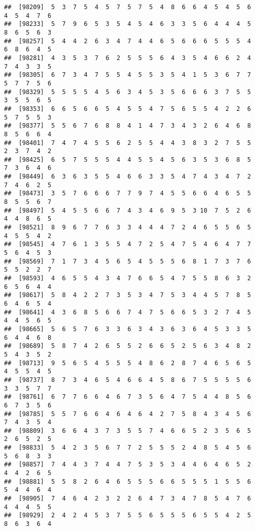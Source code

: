 \documentclass[
]{book}
\begin{document}
\begin{verbatim}
##  [98209]  5  3  7  5  4  5  7  5  7  5  4  8  6  6  4  5  4  5  6  4  5  4  7  6
##  [98233]  5  7  9  6  5  3  5  4  5  4  6  3  3  5  6  4  4  4  5  8  6  5  6  3
##  [98257]  5  4  4  2  6  3  4  7  4  4  6  5  6  6  6  5  5  5  4  6  8  6  4  5
##  [98281]  4  3  5  3  7  6  2  5  5  5  6  4  3  5  4  6  6  2  4  7  4  3  3  5
##  [98305]  6  7  3  4  7  5  5  4  5  5  3  5  4  1  5  3  6  7  7  5  7  7  5  6
##  [98329]  5  5  5  5  4  5  6  3  4  5  3  5  6  6  6  3  7  5  5  3  5  5  6  5
##  [98353]  6  6  5  6  6  5  4  5  5  4  7  5  6  5  5  4  2  2  6  5  7  5  5  3
##  [98377]  5  5  6  7  6  8  8  4  1  4  7  3  4  3  2  6  4  6  8  8  5  6  6  4
##  [98401]  7  4  7  4  5  5  6  2  5  5  4  4  3  8  3  2  7  5  5  2  3  7  4  2
##  [98425]  6  5  7  5  5  5  4  4  5  5  4  5  6  3  5  3  6  8  5  7  3  6  4  6
##  [98449]  6  3  6  3  5  5  4  6  6  3  3  5  4  7  4  3  4  7  2  7  4  6  2  5
##  [98473]  3  5  7  6  6  6  7  7  9  7  4  5  5  6  6  4  6  5  5  8  5  5  6  7
##  [98497]  5  4  5  5  6  6  7  4  3  4  6  9  5  3 10  7  5  2  6  4  4  8  6  5
##  [98521]  8  9  6  7  7  6  3  3  4  4  4  7  2  4  6  5  5  6  5  4  5  5  4  2
##  [98545]  4  7  6  1  3  5  5  4  7  2  5  4  7  5  4  6  4  7  7  5  6  4  5  3
##  [98569]  7  1  7  3  4  5  6  5  4  5  5  5  6  8  1  7  3  7  6  5  5  2  2  7
##  [98593]  4  6  5  5  4  3  4  7  6  6  5  4  7  5  5  8  6  3  2  6  5  6  4  4
##  [98617]  5  8  4  2  2  7  3  5  3  4  7  5  3  4  4  5  7  8  5  6  4  6  5  4
##  [98641]  4  3  6  8  5  6  6  7  4  7  5  6  6  5  3  2  7  4  5  4  4  5  6  5
##  [98665]  5  6  5  7  6  3  3  6  3  4  3  6  3  6  4  5  3  3  5  6  4  4  6  8
##  [98689]  5  8  7  4  2  6  5  5  2  6  6  5  2  5  6  3  4  8  2  5  4  3  5  2
##  [98713]  9  5  6  5  4  5  5  5  4  8  6  2  8  7  4  6  5  6  5  4  5  5  4  5
##  [98737]  8  7  3  4  6  5  4  6  6  4  5  8  6  7  5  5  5  5  6  3  3  5  7  7
##  [98761]  6  7  7  6  6  4  6  7  3  5  6  4  7  5  4  4  8  5  6  6  7  3  5  6
##  [98785]  5  5  7  6  6  4  6  4  6  4  2  7  5  8  4  3  4  5  6  7  4  3  5  4
##  [98809]  3  6  6  4  3  7  3  5  5  7  4  6  6  5  2  3  5  6  5  2  6  5  2  5
##  [98833]  5  4  2  3  5  6  7  7  2  5  5  5  2  4  8  5  4  5  6  5  6  8  3  3
##  [98857]  7  4  4  3  7  4  4  7  5  3  5  3  4  4  6  4  6  5  2  4  4  2  6  5
##  [98881]  5  5  8  2  6  4  6  5  5  5  6  6  5  5  5  1  5  5  6  5  4  4  6  4
##  [98905]  7  4  6  4  2  3  2  2  6  4  7  3  4  7  8  5  4  7  6  4  4  4  5  5
##  [98929]  2  4  2  4  5  3  7  5  5  6  5  5  5  6  5  5  4  2  5  8  6  3  6  4

\end{verbatim}
\end{document}

